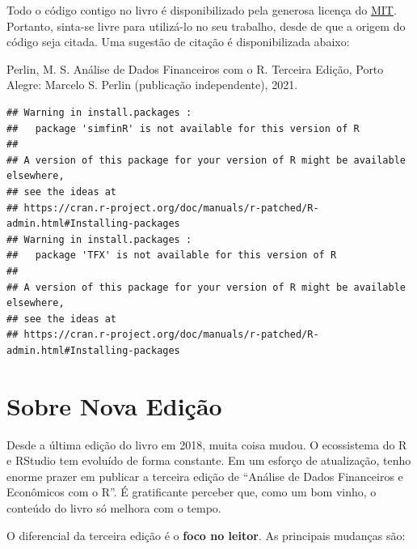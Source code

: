 \documentclass[
  11pt,
]{book}
\begin{document}
Todo o código contigo no livro é disponibilizado pela generosa licença do \href{https://opensource.org/licenses/MIT}{MIT}. Portanto, sinta-se livre para utilizá-lo no seu trabalho, desde de que a origem do código seja citada. Uma sugestão de citação é disponibilizada abaixo:

Perlin, M. S. Análise de Dados Financeiros com o R. Terceira Edição, Porto Alegre: Marcelo S. Perlin (publicação independente), 2021.

{
\setcounter{tocdepth}{2}
\tableofcontents
}
\begin{verbatim}
## Warning in install.packages :
##   package 'simfinR' is not available for this version of R
## 
## A version of this package for your version of R might be available elsewhere,
## see the ideas at
## https://cran.r-project.org/doc/manuals/r-patched/R-admin.html#Installing-packages
## Warning in install.packages :
##   package 'TFX' is not available for this version of R
## 
## A version of this package for your version of R might be available elsewhere,
## see the ideas at
## https://cran.r-project.org/doc/manuals/r-patched/R-admin.html#Installing-packages
\end{verbatim}

\hypertarget{sobre-nova-ediuxe7uxe3o}{%
\chapter*{Sobre Nova Edição}\label{sobre-nova-ediuxe7uxe3o}}

Desde a última edição do livro em 2018, muita coisa mudou. O ecossistema do R e RStudio tem evoluído de forma constante. Em um esforço de atualização, tenho enorme prazer em publicar a terceira edição de ``Análise de Dados Financeiros e Econômicos com o R''. É gratificante perceber que, como um bom vinho, o conteúdo do livro só melhora com o tempo.

O diferencial da terceira edição é o \textbf{foco no leitor}. As principais mudanças são:
\end{document}
